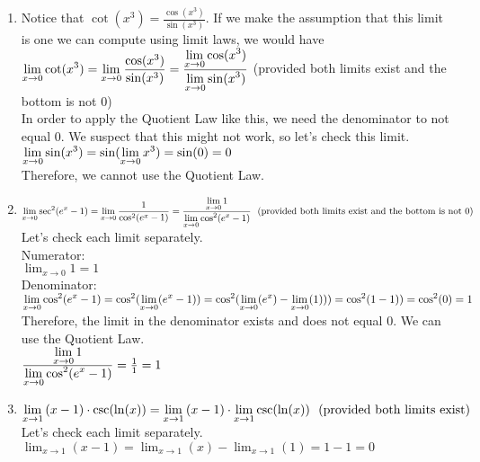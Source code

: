 \documentclass{ximera}
\begin{document}
\begin{question}
\begin{feedback}
\begin{enumerate}
    \item Notice that $\cot(x^3) = \frac{\cos(x^3)}{\sin(x^3)}$.  If we make the assumption that this limit is one we can compute using limit laws, we would have \\
    $\lim_{x\to 0} \cot(x^3) \\
    = \lim_{x\to 0} \frac{\cos(x^3)}{\sin(x^3)} \\
    = \frac{\lim_{x\to 0} \cos(x^3)}{\lim_{x\to 0} \sin(x^3)}$ (provided both limits exist and the bottom is not 0)\\
    In order to apply the Quotient Law like this, we need the denominator to not equal 0.  We suspect that this might not work, so let's check this limit.\\
    $\lim_{x\to 0} \sin(x^3)\\
    = \sin(\lim_{x\to 0}x^3)\\
    =\sin(0)=0$ \\
    Therefore, we cannot use the Quotient Law.
      
    \item $\lim_{x\to 0} \sec^2(e^x-1) \\
    = \lim_{x\to 0} \frac{1}{\cos^2(e^x-1)} \\
   = \frac{ \lim_{x\to 0}1}{ \lim_{x\to 0}\cos^2(e^x-1)} \text{\ \ (provided both limits exist and the bottom is not 0)}$\\
   Let's check each limit separately.\\
   Numerator:\\
   $\lim_{x\to 0}1=1$\\
   Denominator:\\
   $\lim_{x\to 0}\cos^2(e^x-1)\\
   = \cos^2(\lim_{x\to 0}(e^x-1))\\
   = \cos^2(\lim_{x\to 0}(e^x)-\lim_{x\to 0}(1)))\\
   = \cos^2(1-1))\\
   = \cos^2(0)=1$\\
   Therefore, the limit in the denominator exists and does not equal 0.  We can use the Quotient Law.\\
   $\frac{ \lim_{x\to 0}1}{ \lim_{x\to 0}\cos^2(e^x-1)} = \frac{1}{1}=1\\ $
   
   \item $\lim_{x\to 1}{(x-1)\cdot \csc(\ln(x))} \\
   = \lim_{x\to 1}{(x-1)\cdot \lim_{x\to 1}\csc(\ln(x))} \text{\ \ (provided both limits exist)}$\\
   Let's check each limit separately.  \\
   $\lim_{x\to 1} (x-1) = \lim_{x\to 1} (x)-\lim_{x\to 1}(1)=1-1=0$\\
   

\end{enumerate}
\end{feedback}
\end{question}
\end{document}
